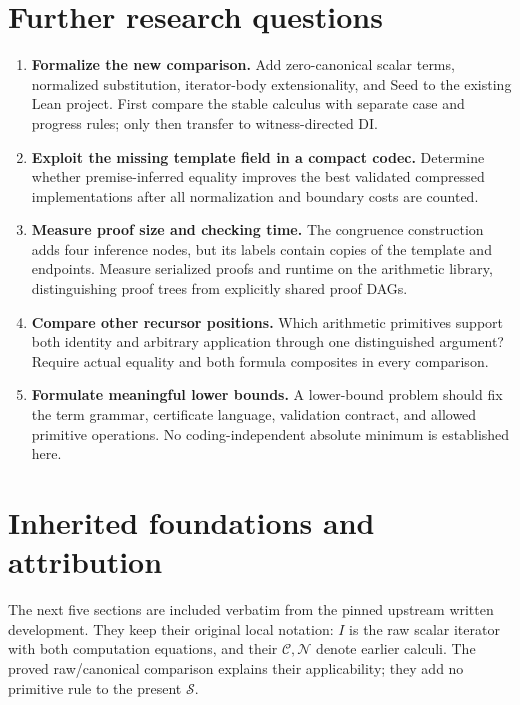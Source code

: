\documentclass[11pt,a4paper]{article}
\theoremstyle{definition}
\begin{document}
\section{Further research questions}

\begin{enumerate}
\item \textbf{Formalize the new comparison.}
Add zero-canonical scalar terms, normalized substitution, iterator-body
extensionality, and Seed to the existing Lean project. First compare
the stable calculus with separate case and progress rules; only then
transfer to witness-directed DI.
\item \textbf{Exploit the missing template field in a compact codec.}
Determine whether premise-inferred equality improves the best
validated compressed implementations after all normalization and
boundary costs are counted.
\item \textbf{Measure proof size and checking time.}
The congruence construction adds four inference nodes, but its labels
contain copies of the template and endpoints. Measure serialized proofs
and runtime on the arithmetic library, distinguishing proof trees
from explicitly shared proof DAGs.
\item \textbf{Compare other recursor positions.}
Which arithmetic primitives support both identity and arbitrary
application through one distinguished argument? Require actual
equality and both formula composites in every comparison.
\item \textbf{Formulate meaningful lower bounds.}
A lower-bound problem should fix the term grammar, certificate
language, validation contract, and allowed primitive operations.
No coding-independent absolute minimum is established here.
\end{enumerate}

\appendix
\clearpage
\section*{Inherited foundations and attribution}

The next five sections are included verbatim from the pinned upstream
written development. They keep their original local notation:
\(I\) is the raw scalar iterator with both computation equations, and
their \(\mathcal C,\mathcal N\) denote earlier calculi.
The proved raw/canonical comparison explains their applicability;
they add no primitive rule to the present \(\mathcal S\).
\end{document}
